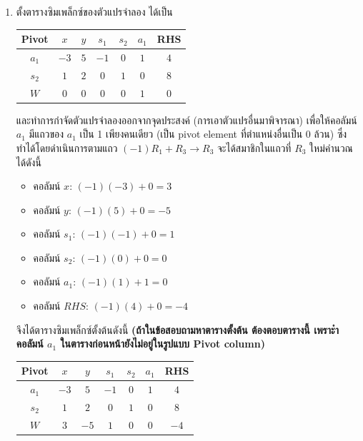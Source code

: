 \begin{solution}
\begin{enumerate}[label=\textbf{ขั้นที่ \arabic*:}, align=left, labelwidth=5em, labelsep=1em, leftmargin=*, itemsep=16pt, topsep=0pt, parsep=0pt, partopsep=0pt]
    \newpage
    \item ตั้งตารางซิมเพล็กซ์ของตัวแปรจำลอง ได้เป็น
    \begin{center}
        \begin{tabular}{|c|ccccc|c|}
            \hline
            \textbf{Pivot} & $x$ & $y$ &  $s_1$ & $s_2$ & $a_1$ &  \textbf{RHS}  \\
            \hline
            $a_1$ & $-3$ & $5$  & $-1$ & $0$ & $1$ & $4$ \\
            $s_2$ & $1$ & $2$  & $0$ & $1$ & $0$ & $8$ \\
            \hline
            $W$   & $0$ & $0$  & $0$ & $0$ & $1$ & $0$ \\
            \hline
        \end{tabular}
    \end{center}
    และทำการกำจัดตัวแปรจำลองออกจากจุดประสงค์ (การเอาตัวแปรอื่นมาพิจารณา) เพื่อให้คอลัมน์ $a_1$ มีแถวของ $a_1$ เป็น 1 เพียงคนเดียว (เป็น pivot element ที่ตำแหน่งอื่นเป็น 0 ล้วน) ซึ่งทำได้โดยดำเนินการตามแถว $(-1)R_1 + R_3 \rightarrow R_3$ จะได้สมาชิกในแถวที่ $R_3$ ใหม่คำนวณได้ดังนี้
    \begin{itemize}
        \item คอลัมน์ $x$: $(-1)(-3) + 0 = 3$
        \item คอลัมน์ $y$: $(-1)(5) + 0 = -5$
        \item คอลัมน์ $s_1$: $(-1)(-1) + 0 = 1$
        \item คอลัมน์ $s_2$: $(-1)(0) + 0 = 0$
        \item คอลัมน์ $a_1$: $(-1)(1) + 1 = 0$
        \item คอลัมน์ $RHS$: $(-1)(4) + 0 = -4$
    \end{itemize}
    จึงได้ตารางซิมเพล็กซ์ตั้งต้นดังนี้ \textbf{(ถ้าในข้อสอบถามหาตารางตั้งต้น ต้องตอบตารางนี้ เพราะำคอลัมน์ $a_1$ ในตารางก่อนหน้ายังไม่อยู่ในรูปแบบ Pivot column)}
    \begin{center}
        \begin{tabular}{|c|ccccc|c|}
            \hline
            \textbf{Pivot} & $x$ & $y$ &  $s_1$ & $s_2$ & $a_1$ &  \textbf{RHS}  \\
            \hline
            $a_1$ & $-3$ & $5$  & $-1$ & $0$ & $1$ & $4$ \\
            $s_2$ & $1$ & $2$  & $0$ & $1$ & $0$ & $8$ \\
            \hline
            $W$   & $3$ & $-5$  & $1$ & $0$ & $0$ & $-4$ \\
            \hline
        \end{tabular}

\end{center}
\end{enumerate}
\end{solution}
